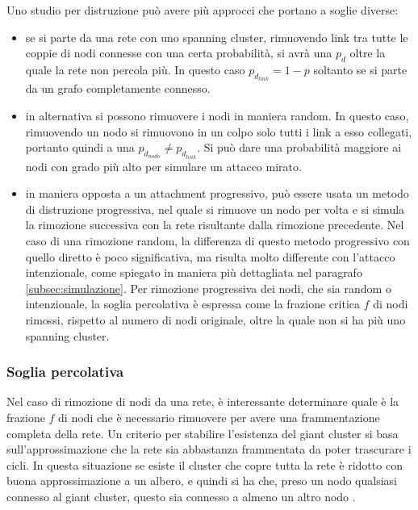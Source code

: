 Uno studio per distruzione pu\`o avere pi\`u approcci che portano a soglie diverse:
\begin{itemize}
 \item se si parte da una rete con uno spanning cluster, rimuovendo link tra tutte le coppie di nodi connesse con una certa probabilit\`a, si avr\`a una $p_d$ oltre la quale la rete non percola pi\`u. In questo caso $p_{d_{link}} = 1-p$ soltanto se si parte da un grafo completamente connesso.
 \item in alternativa si possono rimuovere i nodi in maniera random. In questo caso, rimuovendo un nodo si rimuovono in un colpo solo tutti i link a esso collegati, portanto quindi a una $p_{d_{nodo}} \neq p_{d_{link}}$. Si pu\`o dare una probabilit\`a maggiore ai nodi con grado pi\`u alto per simulare un attacco mirato.
 \item in maniera opposta a un attachment progressivo, pu\`o essere usata un metodo di distruzione progressiva, nel quale si rimuove un nodo per volta e si simula la rimozione successiva con la rete risultante dalla rimozione precedente. Nel caso di una rimozione random, la differenza di questo metodo progressivo con quello diretto \`e poco significativa, ma risulta molto differente con l'attacco intenzionale, come spiegato in maniera pi\`u dettagliata nel paragrafo \ref{subsec:simulazione}. Per rimozione progressiva dei nodi, che sia random o intenzionale, la soglia percolativa \`e espressa come la frazione critica $f$ di nodi rimossi, rispetto al numero di nodi originale, oltre la quale non si ha pi\`u uno spanning cluster.
\end{itemize}

\subsubsection{Soglia percolativa} 
Nel caso di rimozione di nodi da una rete, \`e interessante determinare quale \`e la frazione $f$ di nodi che \`e necessario rimuovere per avere una frammentazione completa della rete. Un criterio per stabilire l'esistenza del giant cluster si basa sull'approssimazione che la rete sia abbastanza frammentata da poter trascurare i cicli. In questa situazione se esiste il cluster che copre tutta la rete \`e ridotto con buona approssimazione a un albero, e quindi si ha che, preso un nodo qualsiasi connesso al giant cluster, questo sia connesso a almeno un altro nodo \parencite{Cohen2000}. 

